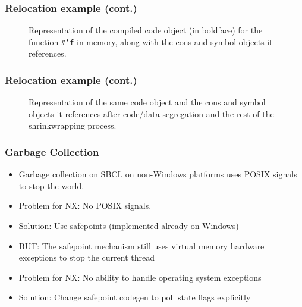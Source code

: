 \documentclass[14pt,t,aspectratio=169]{beamer}
\begin{document}
\begin{frame}
  \frametitle{Relocation example (cont.)}
  \begin{figure}[h]
    \centering
    
    \caption{Representation of the compiled code object (in boldface)
      for the function \protect\texttt{\#'f} in memory, along with the
      cons and symbol objects it references.}
    \label{fig:before-shrinkwrap}
  \end{figure}
\end{frame}

\begin{frame}
  \frametitle{Relocation example (cont.)}
  \begin{figure}[h]
    \centering
    
    \caption{Representation of the same code object and the cons and
      symbol objects it references after code/data segregation and the
      rest of the shrinkwrapping process.}
    \label{fig:after-shrinkwrap}
  \end{figure}
\end{frame}

\begin{frame}
  \frametitle{Garbage Collection}
  \begin{itemize}
  \item Garbage collection on SBCL on non-Windows platforms uses POSIX
    signals to stop-the-world.
  \item \Rightarrow{} Problem for NX: No POSIX signals.
  \item Solution: Use safepoints (implemented already on Windows)
  \item BUT: The safepoint mechanism still uses virtual memory
    hardware exceptions to stop the current thread
  \item \Rightarrow{} Problem for NX: No ability to handle operating system
    exceptions
  \item Solution: Change safepoint codegen to poll state flags
    explicitly
  \end{itemize}
\end{frame}
\end{document}
